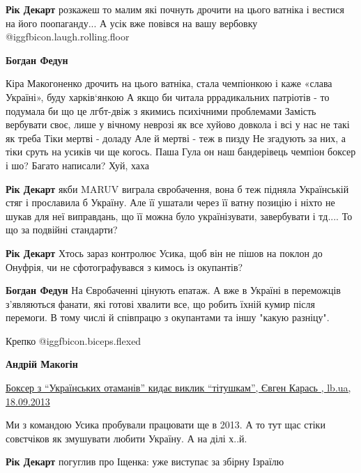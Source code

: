 \begin{itemize}
\begin{itemize}
\textbf{Рік Декарт} розкажеш то малим які почнуть дрочити на цього ватніка і вестися на його поопаганду...
А усік вже повівся на вашу вербовку @igg{fbicon.laugh.rolling.floor} 

\textbf{Богдан Федун} 

\obeycr
Кіра Макогоненко дрочить на цього ватніка, стала чемпіонкою і каже «слава Україні», буду харків‘янкою
А якщо би читала рррадикальних патріотів - то подумала би що це лгбт-двіж з якимись психічними проблемами
Замість вербувати своє, лише у вічному неврозі як все хуйово довкола і всі у нас не такі як треба
Тіки мертві - доладу
Але й мертві - теж в пизду
Не згадують за них, а тіки сруть на усиків чи ще когось.
Паша Гула он наш бандерівець чемпіон боксер і шо?
Багато написали?
Хуй, хаха
\restorecr

\textbf{Рік Декарт} якби MARUV виграла євробачення, вона б теж підняла Українській стяг і прославила б Україну.
Але її ушатали через її ватну позицію і ніхто не шукав для неї виправдань, що її можна було українізувати, завербувати і тд....
То що за подвійні стандарти?

\textbf{Рік Декарт} Хтось зараз контролює Усика, щоб він не пішов на поклон до Онуфрія, чи не сфотографувався з кимось із окупантів?

\textbf{Богдан Федун} На Євробаченні цінують епатаж. А вже в Україні в переможців з'являються фанати, які готові хвалити все, що робить їхній кумир після перемоги. В тому числі й співпрацю з окупантами та іншу "какую разніцу".
\end{itemize} %

Крепко @igg{fbicon.biceps.flexed} 


\begin{itemize} %
\textbf{Андрій Макогін}

\href{https://lb.ua/blog/evgen_karas/227414_sportsmeni_ukraini_naymantsi_vladi.html}{%
Боксер з \enquote{Українських отаманів} кидає виклик \enquote{тітушкам}, Євген Карась , lb.ua, 18.09.2013%
}

Ми з командою Усика пробували працювати ще в 2013.
А то тут щас стіки совєтчіков як змушувати любити Україну. А на ділі х..й.

\textbf{Рік Декарт} погуглив про Іщенка: уже виступає за збірну Ізраїлю

\end{itemize} %


\end{itemize}
